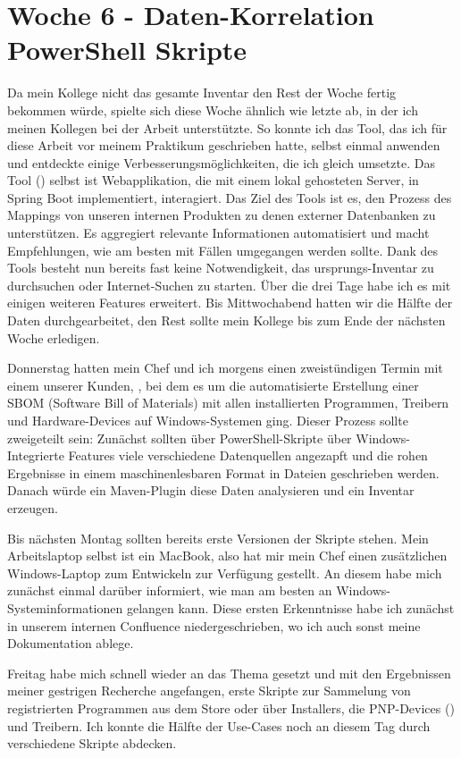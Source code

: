\section{Woche 6 - Daten-Korrelation \headerand PowerShell Skripte} \label{sec:bericht-wo-6}


\lweekdaymarginpar{\weekdayMondayShort\ - \weekdayWednesdayShort}

Da mein Kollege nicht das gesamte Inventar den Rest der Woche fertig bekommen würde, spielte sich diese Woche ähnlich wie letzte ab, in der ich meinen Kollegen bei der Arbeit unterstützte.
So konnte ich das Tool, das ich für diese Arbeit vor meinem Praktikum geschrieben hatte, selbst einmal anwenden und entdeckte einige Verbesserungsmöglichkeiten, die ich gleich umsetzte.
Das Tool () selbst ist Webapplikation, die mit einem lokal gehosteten Server, in Spring Boot implementiert, interagiert.
Das Ziel des Tools ist es, den Prozess des Mappings von unseren internen Produkten zu denen externer Datenbanken zu unterstützen.
Es aggregiert relevante Informationen automatisiert und macht Empfehlungen, wie am besten mit Fällen umgegangen werden sollte.
Dank des Tools besteht nun bereits fast keine Notwendigkeit, das ursprungs-Inventar zu durchsuchen oder Internet-Suchen zu starten.
Über die drei Tage habe ich es mit einigen weiteren Features erweitert.
Bis Mittwochabend hatten wir die Hälfte der Daten durchgearbeitet, den Rest sollte mein Kollege bis zum Ende der nächsten Woche erledigen.

\sweekdaymarginpar{\weekdayThursdayLong}

Donnerstag hatten mein Chef und ich morgens einen zweistündigen Termin mit einem unserer Kunden, {\aeclientZEZESE}, bei dem es um die automatisierte Erstellung einer SBOM (Software Bill of Materials) mit allen installierten Programmen, Treibern und Hardware-Devices auf Windows-Systemen ging.
Dieser Prozess sollte zweigeteilt sein:
Zunächst sollten über PowerShell-Skripte über Windows-Integrierte Features viele verschiedene Datenquellen angezapft und die rohen Ergebnisse in einem maschinenlesbaren Format in Dateien geschrieben werden.
Danach würde ein Maven-Plugin diese Daten analysieren und ein Inventar erzeugen.

Bis nächsten Montag sollten bereits erste Versionen der Skripte stehen.
Mein Arbeitslaptop selbst ist ein MacBook, also hat mir mein Chef einen zusätzlichen Windows-Laptop zum Entwickeln zur Verfügung gestellt.
An diesem habe mich zunächst einmal darüber informiert, wie man am besten an Windows-Systeminformationen gelangen kann.
Diese ersten Erkenntnisse habe ich zunächst in unserem internen Confluence niedergeschrieben, wo ich auch sonst meine Dokumentation ablege.

\sweekdaymarginpar{\weekdayFridayLong}

Freitag habe mich schnell wieder an das Thema gesetzt und mit den Ergebnissen meiner gestrigen Recherche angefangen, erste Skripte zur Sammelung von registrierten Programmen aus dem Store oder über Installers, die PNP-Devices () und Treibern.
Ich konnte die Hälfte der Use-Cases noch an diesem Tag durch verschiedene Skripte abdecken.
